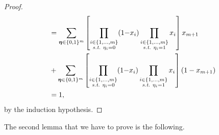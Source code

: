 \begin{noaddcontents}
\begin{proof}
\begin{align*}
    &= \sum_{\boldsymbol{\eta}\in\{0,1\}^{m}} \left[ \prod_{\substack{i\in\{1,\dots,m\}\\ \text{{\it s.t.}}\ \eta_i=0}} (1{-}x_i)\prod_{\substack{i\in\{1,\dots,m\}\\ \text{{\it s.t.}}\ \eta_i=1}} x_i \right] x_{m+1}\\
    &+ \sum_{\boldsymbol{\eta}\in\{0,1\}^{m}} \left[ \prod_{\substack{i\in\{1,\dots,m\}\\ \text{{\it s.t.}}\ \eta_i=0}} (1{-}x_i)\prod_{\substack{i\in\{1,\dots,m\}\\ \text{{\it s.t.}}\ \eta_i=1}} x_i \right] (1-x_{m+1})\\
    &= 1,
\end{align*}
by the induction hypothesis.
\end{proof}

The second lemma that we have to prove is the following.


\end{noaddcontents}
